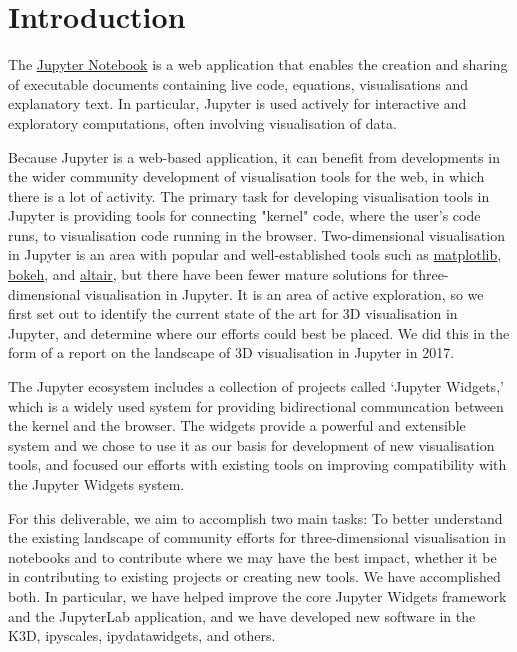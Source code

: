\documentclass{deliverablereport}
\author{Benjamin Ragan-Kelley, Vidar Tonaas Fauske, Marcin Kostur}
\begin{document}
\maketitle
\tableofcontents


\section{Introduction}

The \href{https://jupyter.org}{Jupyter Notebook} is a web application
that enables the creation and sharing of executable documents
containing live code, equations, visualisations and explanatory text.
In particular, Jupyter is used actively for interactive and exploratory computations,
often involving visualisation of data.

Because Jupyter is a web-based application,
it can benefit from developments in the wider community development of visualisation tools for the web, in which there is a lot of activity.
The primary task for developing visualisation tools in Jupyter is providing tools for connecting
"kernel" code, where the user's code runs,
to visualisation code running in the browser.
Two-dimensional visualisation in Jupyter is an area with popular and well-established tools
such as \href{https://matplotlib.org}{matplotlib}, \href{https://bokeh.pydata.org/}{bokeh}, and \href{https://altair-viz.github.io}{altair},
but there have been fewer mature solutions for three-dimensional visualisation in Jupyter.
It is an area of active exploration,
so we first set out to identify the current state of the art for 3D visualisation in Jupyter,
and determine where our efforts could best be placed.
We did this in the form of a report on the landscape of 3D visualisation in Jupyter in 2017.

The Jupyter ecosystem includes a collection of projects called `Jupyter Widgets,'
which is a widely used system for providing bidirectional communcation
between the kernel and the browser.
The widgets provide a powerful and extensible system and we chose to use it as our basis for development of new visualisation tools,
and focused our efforts with existing tools on improving compatibility with the Jupyter Widgets system.

For this deliverable, we aim to accomplish two main tasks: To better
understand the existing landscape of community efforts for three-dimensional
visualisation in notebooks and to contribute where we may have the best
impact, whether it be in contributing to existing projects or creating new
tools. We have accomplished both. In particular, we have helped improve the
core Jupyter Widgets framework and the JupyterLab application, and we have
developed new software in the K3D, ipyscales, ipydatawidgets, and others.
\end{document}
